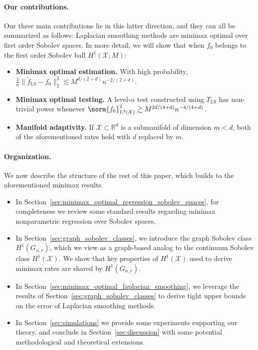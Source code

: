 \documentclass{article}
\newcommand{\Reals}{\mathbb{R}}
\newcommand{\1}{\mathbf{1}}
\newcommand{\Rd}{\Reals^d}
\newcommand{\Xset}{\mathcal{X}}
\newcommand{\Leb}{L}
\newcommand{\mc}[1]{\mathcal{#1}}
\newcommand{\wt}[1]{\widetilde{#1}}
\newcommand{\LS}{\mathrm{LS}}
\theoremstyle{alden}
\theoremstyle{aldenthm}
\theoremstyle{definition}
\theoremstyle{remark}
\begin{document}
\paragraph{Our contributions.} Our three main contributions lie in this latter direction, and they can all be summarized as follows: Laplacian smoothing methods are minimax optimal over first order Sobolev spaces. In more detail, we will show that when $f_0$ belongs to the first order Sobolev ball $H^1(\Xset;M)$:
\begin{itemize}
	\item \textbf{Minimax optimal estimation.} With high probability, $\frac{1}{n}\bigl\|\wt{f}_{\LS} - f_0\bigr\|_{2}^2 \lesssim M^{d/(2+d)}n^{-2/(2 + d)}$.
	\item \textbf{Minimax optimal testing.}
	A level-$\alpha$ test constructed using $T_{\LS}$ has non-trivial power whenever $\norm{f_0}_{\Leb^2(\Xset)}^2 \gtrsim M^{2d/(4 + d)}n^{-4/(4 + d)}$. 
	\item \textbf{Manifold adaptivity.}
	If $\mc{X} \subset \Rd$ is a submanifold of dimension $m < d$, both of the aforementioned rates hold with $d$ replaced by $m$.
\end{itemize}

\paragraph{Organization.} We now describe the structure of the rest of this paper, which builds to the aforementioned minimax results.
\begin{itemize}
	\item In Section~\ref{sec:minimax_optimal_regression_sobolev_spaces}, for completeness we review some standard results regarding minimax nonparametric regression over Sobolev spaces.
	\item In Section~\ref{sec:graph_sobolev_classes}, we introduce the graph Sobolev class $H^1(G_{n,r})$, which we view as a graph-based analog to the continuum Sobolev class $H^1(\Xset)$. We show that key properties of $H^1(\Xset)$ used to derive minimax rates are shared by $H^1(G_{n,r})$.
	\item In Section~\ref{sec:minimax_optimal_laplacian_smoothing}, we leverage the results of Section~\ref{sec:graph_sobolev_classes} to derive tight upper bounds on the error of Laplacian smoothing methods.
	\item In Section~\ref{sec:simulations} we provide some experiments supporting our theory, and conclude in Section~\ref{sec:discussion} with some potential methodological and theoretical extensions.
\end{itemize}
\end{document}
